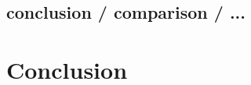 \documentclass{article}
\begin{document}
\subsection{conclusion / comparison / ...}


\section{Conclusion}


\newpage
\nocite{*}



\begin{appendices}




\end{appendices}
\end{document}
